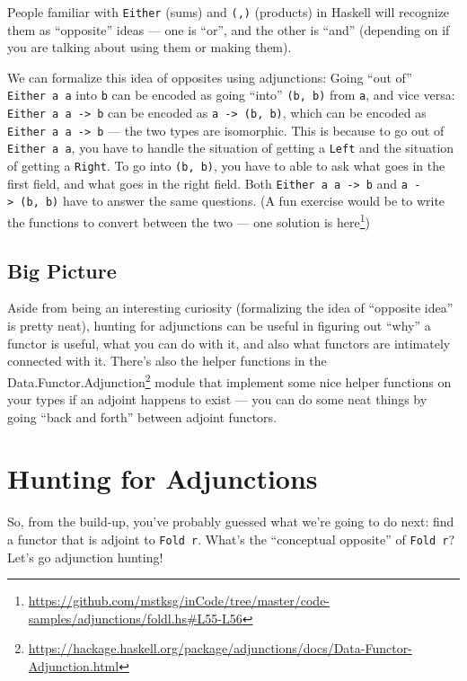 \documentclass[]{article}
\renewcommand{\href}[2]{#2\footnote{\url{#1}}}
\begin{document}
People familiar with \texttt{Either} (sums) and \texttt{(,)} (products) in
Haskell will recognize them as ``opposite'' ideas --- one is ``or'', and the
other is ``and'' (depending on if you are talking about using them or making
them).

We can formalize this idea of opposites using adjunctions: Going ``out of''
\texttt{Either\ a\ a} into \texttt{b} can be encoded as going ``into''
\texttt{(b,\ b)} from \texttt{a}, and vice versa:
\texttt{Either\ a\ a\ -\textgreater{}\ b} can be encoded as
\texttt{a\ -\textgreater{}\ (b,\ b)}, which can be encoded as
\texttt{Either\ a\ a\ -\textgreater{}\ b} --- the two types are isomorphic. This
is because to go out of \texttt{Either\ a\ a}, you have to handle the situation
of getting a \texttt{Left} and the situation of getting a \texttt{Right}. To go
into \texttt{(b,\ b)}, you have to able to ask what goes in the first field, and
what goes in the right field. Both \texttt{Either\ a\ a\ -\textgreater{}\ b} and
\texttt{a\ -\textgreater{}\ (b,\ b)} have to answer the same questions. (A fun
exercise would be to write the functions to convert between the two ---
\href{https://github.com/mstksg/inCode/tree/master/code-samples/adjunctions/foldl.hs\#L55-L56}{one
solution is here})

\hypertarget{big-picture}{%
\subsection{Big Picture}\label{big-picture}}

Aside from being an interesting curiosity (formalizing the idea of ``opposite
idea'' is pretty neat), hunting for adjunctions can be useful in figuring out
``why'' a functor is useful, what you can do with it, and also what functors are
intimately connected with it. There's also the helper functions in the
\href{https://hackage.haskell.org/package/adjunctions/docs/Data-Functor-Adjunction.html}{Data.Functor.Adjunction}
module that implement some nice helper functions on your types if an adjoint
happens to exist --- you can do some neat things by going ``back and forth''
between adjoint functors.

\hypertarget{hunting-for-adjunctions}{%
\section{Hunting for Adjunctions}\label{hunting-for-adjunctions}}

So, from the build-up, you've probably guessed what we're going to do next: find
a functor that is adjoint to \texttt{Fold\ r}. What's the ``conceptual
opposite'' of \texttt{Fold\ r}? Let's go adjunction hunting!
\end{document}
